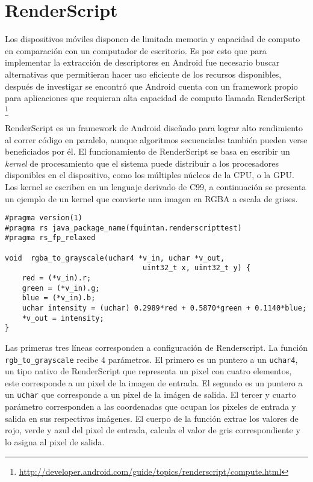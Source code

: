\section{RenderScript}
Los dispositivos móviles disponen de limitada memoria y capacidad de computo en comparación con un computador de escritorio. Es por esto que para implementar la extracción de descriptores en Android fue necesario buscar alternativas que permitieran hacer uso eficiente de los recursos disponibles, después de investigar se encontró que Android cuenta con un framework propio para aplicaciones que requieran alta capacidad de computo llamada RenderScript \footnote{\url{http://developer.android.com/guide/topics/renderscript/compute.html}}

RenderScript es un framework de Android diseñado para lograr alto rendimiento al correr código en paralelo, aunque algoritmos secuenciales también pueden verse beneficiados por él. El funcionamiento de RenderScript se basa en escribir un \emph{kernel} de procesamiento que el sistema puede distribuir a los procesadores disponibles en el dispositivo, como los múltiples núcleos de la CPU, o la GPU. 
Los kernel se escriben en un lenguaje derivado de C99, a continuación se presenta un ejemplo de un kernel que convierte una imagen en RGBA a escala de grises.

\begin{lstlisting}[basicstyle=\small,frame=bt]
#pragma version(1)
#pragma rs java_package_name(fquintan.renderscripttest)
#pragma rs_fp_relaxed

void  rgba_to_grayscale(uchar4 *v_in, uchar *v_out,
                                uint32_t x, uint32_t y) {
    red = (*v_in).r;
    green = (*v_in).g;
    blue = (*v_in).b;
    uchar intensity = (uchar) 0.2989*red + 0.5870*green + 0.1140*blue;
    *v_out = intensity;
}
\end{lstlisting}

Las primeras tres líneas corresponden a configuración de Renderscript. La función \texttt{rgb\_to\_grayscale} recibe 4 parámetros. El primero es un puntero a un \texttt{uchar4}, un tipo nativo de RenderScript que representa un pixel con cuatro elementos, este corresponde a un pixel de la imagen de entrada. El segundo es un puntero a un \texttt{uchar} que corresponde a un pixel de la imágen de salida. El tercer y cuarto parámetro corresponden a las coordenadas que ocupan los pixeles de entrada y salida en sus respectivas imágenes. El cuerpo de la función extrae los valores de rojo, verde y azul del pixel de entrada, calcula el valor de gris correspondiente y lo asigna al pixel de salida.

